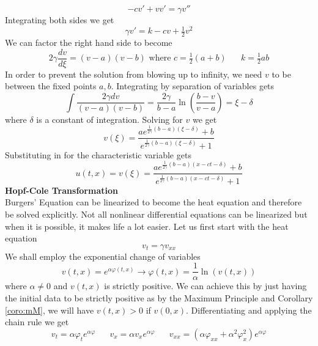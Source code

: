 \documentclass{article}
\newcommand{\od}[2]{\frac{d #1}{d #2}}
\numberwithin{equation}{section}
\begin{document}
\begin{equation}
    -cv'+vv'= \gamma v''
\end{equation}
Integrating both sides we get 
\begin{equation*}
    \gamma v' = k - cv+\tfrac{1}{2}v^2
\end{equation*}
We can factor the right hand side to become 
\begin{equation}
    2\gamma \od{v}{\xi} = (v-a)(v-b) \text{ where } c=\tfrac{1}{2}(a+b) \hspace{20pt} k=\tfrac{1}{2}ab
\end{equation}
In order to prevent the solution from blowing up to infinity, we need $v$ to be between the fixed points $a,b$. Integrating by separation of variables gets 
\begin{equation}
    \int\frac{2\gamma dv}{(v-a)(v-b)} = \frac{2\gamma}{b-a}\ln \left( \frac{b-v}{v-a} \right) = \xi -\delta
\end{equation}
where $\delta$ is a constant of integration. Solving for $v$ we get 
\begin{equation*}
    v(\xi) =\frac{ae^{\frac{1}{2\gamma}(b-a)(\xi-\delta)}+b}{e^{\frac{1}{2\gamma}(b-a)(\xi -\delta)}+1}
\end{equation*}
Substituting in for the characteristic variable gets 
\begin{equation}
    u(t,x) =v(\xi) =\frac{ae^{\frac{1}{2\gamma}(b-a)(x-ct-\delta)}+b}{e^{\frac{1}{2\gamma}(b-a)(x-ct -\delta)}+1}
\end{equation}
\textbf{Hopf-Cole Transformation} \\
Burgers' Equation can be linearized to become the heat equation and therefore be solved explicitly. Not all nonlinear differential equations can be linearized but when it is possible, it makes life a lot easier. Let us first start with the heat equation 
\begin{equation*}
    v_t = \gamma v_{xx}
\end{equation*}
We shall employ the exponential change of variables 
\begin{equation*}
    v(t,x) = e^{\alpha \varphi(t,x)} \rightarrow \varphi(t,x) = \frac{1}{\alpha}\ln (v(t,x))
\end{equation*}
where $\alpha \neq 0$ and $v(t,x)$ is strictly positive. We can achieve this by just having the initial data to be strictly positive as by the Maximum Principle and Corollary \ref{coro:mM}, we will have $v(t,x) > 0$ if $v(0,x)$. Differentiating and applying the chain rule we get 
\begin{equation*}
    v_t = \alpha\varphi_te^{\alpha \varphi} \hspace{20pt} v_x = \alpha v_x e^{\alpha \varphi} \hspace{20pt} v_{xx} = (\alpha \varphi_{xx}+\alpha^2\varphi_x^2)e^{\alpha \varphi} 
\end{equation*}
\end{document}
